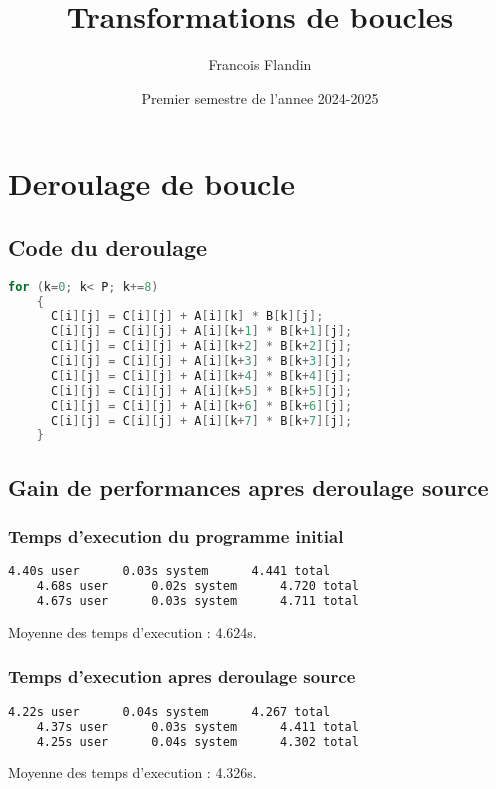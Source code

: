 \documentclass{rapport}
\title{Transformations de boucles}
\author{Francois Flandin}
\date{Premier semestre de l'annee 2024-2025}
\begin{document}
  \maketitle

  \clearpage
  \tableofcontents

  \clearpage
  \section{Deroulage de boucle}
  \subsection{Code du deroulage}
  \begin{lstlisting}[language=C]
    for (k=0; k< P; k+=8)
    {
      C[i][j] = C[i][j] + A[i][k] * B[k][j];
      C[i][j] = C[i][j] + A[i][k+1] * B[k+1][j];
      C[i][j] = C[i][j] + A[i][k+2] * B[k+2][j];
      C[i][j] = C[i][j] + A[i][k+3] * B[k+3][j];
      C[i][j] = C[i][j] + A[i][k+4] * B[k+4][j];
      C[i][j] = C[i][j] + A[i][k+5] * B[k+5][j];
      C[i][j] = C[i][j] + A[i][k+6] * B[k+6][j];
      C[i][j] = C[i][j] + A[i][k+7] * B[k+7][j];
    }
  \end{lstlisting}

  \subsection{Gain de performances apres deroulage source}
  \subsubsection*{Temps d'execution du programme initial}
  \begin{lstlisting}[language=sh]
    4.40s user      0.03s system      4.441 total
    4.68s user      0.02s system      4.720 total
    4.67s user      0.03s system      4.711 total
  \end{lstlisting}
  Moyenne des temps d'execution : 4.624s.

  \newline\newline
  \subsubsection*{Temps d'execution apres deroulage source}
  \begin{lstlisting}[language=sh]
    4.22s user      0.04s system      4.267 total
    4.37s user      0.03s system      4.411 total
    4.25s user      0.04s system      4.302 total
  \end{lstlisting}
  Moyenne des temps d'execution : 4.326s.
  \newline
\end{document}
